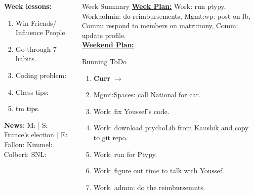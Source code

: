 \begin{columns}
\begin{column}{0.20\linewidth}
      \begin{block}
        {\tiny {\bf Week lessons:}}
        \begin{enumerate}
          \tiny \item \tiny Win Friends/ Influence People
        \item \tiny Go through 7 habits.
        \item \tiny Coding problem: 
        \item \tiny Chess tips: 
        \item \tiny tm tips.
        \end{enumerate}
            {{\tiny {\tiny \bf  News:}} {\tiny  M: | S: France's
                election | E: Fallon:   Kimmel:  Colbert: SNL:}}
      \end{block}
    \end{column}
  \begin{column}{0.6\linewidth}
    \begin{block}{Week Summary} 
      {\underline {\bf Week Plan:}
        Work: run ptypy, Work:admin: do reimbursements, Mgmt:wp: post
        on fb, Comm: respond to members on matrimony, Comm: update
        profile.  }\\

      {\underline{\bf Weekend Plan:} }\\
    \end{block}
      \begin{block}{Running ToDo} %
        \begin{enumerate} 
            
           . 

        \item \tiny \textbf{Curr} $\rightarrow$
       
        \item \tiny Mgmt:Spaces: call National for car. 

        \item \tiny Work: fix Youssef's code.    
        \item \tiny Work: download ptychoLib from Kaushik and copy to git repo. 
        \item \tiny Work: run for Ptypy. 
        \item \tiny Work: figure out time to talk with Youssef. 
        \item \tiny Work: admin: do the reimbursemnts. 


\end{enumerate}
\end{block}
\end{column}
\end{columns}
